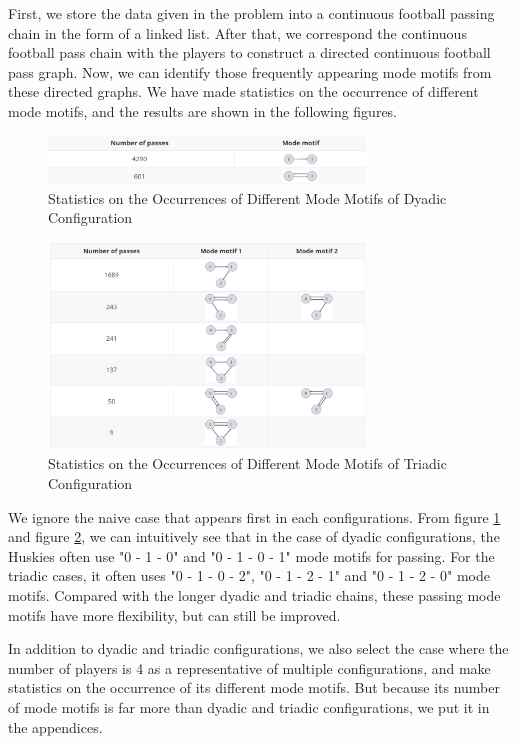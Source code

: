 \documentclass{mcmthesis}
\begin{document}
	First, we store the data given in the problem into a continuous football passing chain in the form of a linked list.  After that, we correspond the continuous football pass chain with the players to construct a directed continuous football pass graph.  Now, we can identify those frequently appearing mode motifs from these directed graphs.  We have made statistics on the occurrence of different mode motifs, and the results are shown in the following figures.

	\begin{figure}[h]
		\centering
		\includegraphics[width=0.75\textwidth]{figures/motif2.png}
		\caption{Statistics on the Occurrences of Different Mode Motifs of Dyadic Configuration}
		\label{fig:motif2}
	\end{figure}
	\begin{figure}[h]
		\centering
		\includegraphics[width=0.75\textwidth]{figures/motif3.png}
		\caption{Statistics on the Occurrences of Different Mode Motifs of Triadic Configuration}
		\label{fig:motif3}
	\end{figure}
	
	We ignore the naive case that appears first in each configurations.  From figure \ref{fig:motif2} and figure \ref{fig:motif3}, we can intuitively see that in the case of dyadic configurations, the Huskies often use "0 - 1 - 0" and "0 - 1 - 0 - 1" mode motifs for passing.  For the triadic cases, it often uses "0 - 1 - 0 - 2", "0 - 1 - 2 - 1" and "0 - 1 - 2 - 0" mode motifs.  Compared with the longer dyadic and triadic chains, these passing mode motifs have more flexibility, but  can still be improved.

	In addition to dyadic and triadic configurations, we also select the case where the number of players is 4 as a representative of multiple configurations, and make statistics on the occurrence of its different mode motifs.  But because its number of mode motifs is far more than dyadic and triadic configurations, we put it in the appendices.
\end{document}
